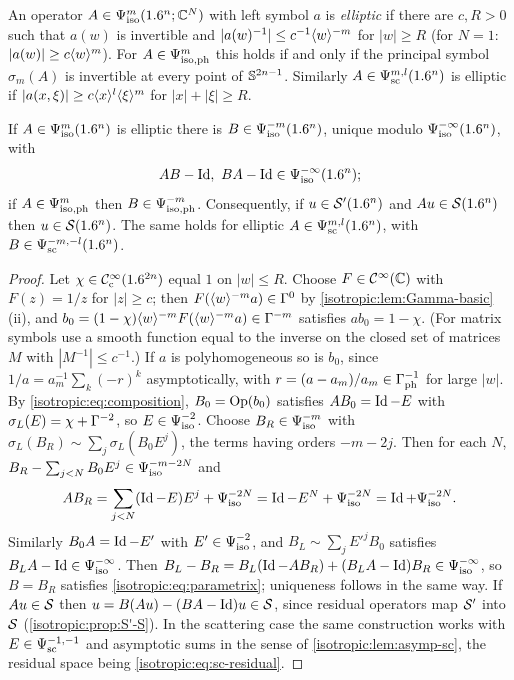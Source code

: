 \begin{definition}\label{isotropic:def:elliptic}
An operator $A\in\Psi^{m}_{\mathrm{iso}}(1.6^n;\mathbb{C}^N)$ with left symbol $a$ is \emph{elliptic}
if there are $c,R>0$ such that $a(w)$ is invertible and
$|a(w)^{-1}|\le c^{-1}\langle w\rangle^{-m}$ for $|w|\ge R$ (for $N=1$:
$|a(w)|\ge c\langle w\rangle^m$). For $A\in\Psi^{m}_{\mathrm{iso,ph}}$ this holds if and only if the
principal symbol $\sigma_m(A)$ is invertible at every point of
$\mathbb{S}^{2n-1}$. Similarly $A\in\Psi^{m,l}_{\mathrm{sc}}(1.6^n)$ is elliptic if
$|a(x,\xi)|\ge c\langle x\rangle^l\langle \xi\rangle^m$ for $|x|+|\xi|\ge R$.
\end{definition}

\begin{theorem}\label{isotropic:thm:parametrix}
If $A\in\Psi^{m}_{\mathrm{iso}}(1.6^n)$ is elliptic there is $B\in\Psi^{-m}_{\mathrm{iso}}(1.6^n)$, unique
modulo $\Psi^{-\infty}_{\mathrm{iso}}(1.6^n)$, with
\begin{equation}\label{isotropic:eq:parametrix}
  AB-\operatorname{Id},\ BA-\operatorname{Id}\in\Psi^{-\infty}_{\mathrm{iso}}(1.6^n);
\end{equation}
if $A\in\Psi^{m}_{\mathrm{iso,ph}}$ then $B\in\Psi^{-m}_{\mathrm{iso,ph}}$. Consequently, if $u\in\mathcal{S}'(1.6^n)$
and $Au\in\mathcal{S}(1.6^n)$ then $u\in\mathcal{S}(1.6^n)$. The same holds for elliptic
$A\in\Psi^{m,l}_{\mathrm{sc}}(1.6^n)$, with $B\in\Psi^{-m,-l}_{\mathrm{sc}}(1.6^n)$.
\end{theorem}
\begin{proof}
Let $\chi\in\mathcal{C}^\infty_{\mathrm{c}}(1.6^{2n})$ equal $1$ on $|w|\le R$. Choose $F\in\mathcal{C}^\infty(\mathbb{C})$ with
$F(z)=1/z$ for $|z|\ge c$; then $F(\langle w\rangle^{-m}a)\in\Gamma^{0}$ by
\cref{isotropic:lem:Gamma-basic}(ii), and
$b_0=(1-\chi)\langle w\rangle^{-m}F(\langle w\rangle^{-m}a)\in\Gamma^{-m}$ satisfies $ab_0=1-\chi$.
(For matrix symbols use a smooth function equal to the inverse on the closed
set of matrices $M$ with $|M^{-1}|\le c^{-1}$.) If $a$ is polyhomogeneous so is
$b_0$, since $1/a=a_m^{-1}\sum_k(-r)^k$ asymptotically, with $r=(a-a_m)/a_m\in\Gamma^{-1}_{\mathrm{ph}}$
for large $|w|$. By \eqref{isotropic:eq:composition}, $B_0=\operatorname{Op}(b_0)$ satisfies
$AB_0=\operatorname{Id}-E$ with $\sigma_L(E)=\chi+\Gamma^{-2}$, so $E\in\Psi^{-2}_{\mathrm{iso}}$. Choose
$B_R\in\Psi^{-m}_{\mathrm{iso}}$ with $\sigma_L(B_R)\sim\sum_j\sigma_L(B_0E^j)$, the terms
having orders $-m-2j$. Then for each $N$, $B_R-\sum_{j<N}B_0E^j\in\Psi^{-m-2N}_{\mathrm{iso}}$
and
\begin{equation*}
  AB_R=\sum_{j<N}(\operatorname{Id}-E)E^j+\Psi^{-2N}_{\mathrm{iso}}=\operatorname{Id}-E^N+\Psi^{-2N}_{\mathrm{iso}}=\operatorname{Id}+\Psi^{-2N}_{\mathrm{iso}}.
\end{equation*}
Similarly $B_0A=\operatorname{Id}-E'$ with $E'\in\Psi^{-2}_{\mathrm{iso}}$, and $B_L\sim\sum_jE'^jB_0$
satisfies $B_LA-\operatorname{Id}\in\Psi^{-\infty}_{\mathrm{iso}}$. Then
$B_L-B_R=B_L(\operatorname{Id}-AB_R)+(B_LA-\operatorname{Id})B_R\in\Psi^{-\infty}_{\mathrm{iso}}$, so $B=B_R$ satisfies
\eqref{isotropic:eq:parametrix}; uniqueness follows in the same way. If
$Au\in\mathcal{S}$ then $u=B(Au)-(BA-\operatorname{Id})u\in\mathcal{S}$, since residual operators map $\mathcal{S}'$
into $\mathcal{S}$ (\cref{isotropic:prop:S'-S}). In the scattering case the same
construction works with $E\in\Psi^{-1,-1}_{\mathrm{sc}}$ and asymptotic sums in the sense
of \cref{isotropic:lem:asymp-sc}, the residual space being
\eqref{isotropic:eq:sc-residual}.
\end{proof}

